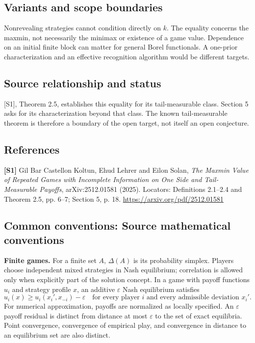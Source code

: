 \documentclass[11pt,a4paper]{article}
\begin{document}
\subsection*{Variants and scope boundaries}
Nonrevealing strategies cannot condition directly on $k$. The equality concerns the maxmin, not necessarily the minimax or existence of a game value. Dependence on an initial finite block can matter for general Borel functionals. A one-prior characterization and an effective recognition algorithm would be different targets.
\subsection*{Source relationship and status}
[S1], Theorem 2.5, establishes this equality for its tail-measurable class. Section 5 asks for its characterization beyond that class. The known tail-measurable theorem is therefore a boundary of the open target, not itself an open conjecture.
\subsection*{References}
\begingroup\footnotesize\raggedright
\textbf{[S1]} Gil Bar Castellon Koltun, Ehud Lehrer and Eilon Solan, \emph{The Maxmin Value of Repeated Games with Incomplete Information on One Side and Tail-Measurable Payoffs}, arXiv:2512.01581 (2025). Locators: Definitions 2.1--2.4 and Theorem 2.5, pp. 6--7; Section 5, p. 18. \url{https://arxiv.org/pdf/2512.01581}
\par\endgroup

\subsection*{Common conventions: Source mathematical conventions}

\textbf{Finite games.} For a finite set $A$, $\Delta(A)$ is its probability
simplex. Players choose independent mixed strategies in Nash equilibrium;
correlation is allowed only when explicitly part of the solution concept.
In a game with payoff functions $u_i$ and strategy profile $x$, an additive
$\varepsilon$ Nash equilibrium satisfies
\[
 u_i(x)\geq u_i(x_i',x_{-i})-\varepsilon
 \quad\text{for every player $i$ and every admissible deviation $x_i'$}.
\]
For numerical approximation, payoffs are normalized as locally specified.
An $\varepsilon$ payoff residual is distinct from distance at most
$\varepsilon$ to the set of exact equilibria. Point convergence, convergence
of empirical play, and convergence in distance to an equilibrium set are
also distinct.
\end{document}
